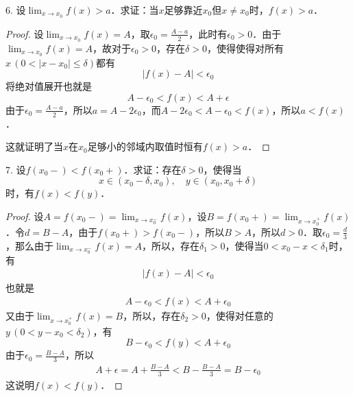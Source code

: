 6. 设$\displaystyle\lim_{x \to x_0} f(x) > a$．求证：当$x$足够靠近$x_0$但$x \neq x_0$时，$f(x) > a$．

\begin{proof}
设$\displaystyle\lim_{x \to x_0} f(x) = A$，取$\epsilon_0 = \displaystyle\frac{A-a}{2}$，此时有$\epsilon_0 > 0$．由于$\displaystyle\lim_{x \to x_0} f(x) = A$，故对于$\epsilon_0 > 0$，存在$\delta > 0$，使得使得对所有$x \, (0 < |x-x_0| \leq \delta)$都有
\begin{equation}
    |f(x)-A|<\epsilon_0
\end{equation}
将绝对值展开也就是
\begin{equation}
    A-\epsilon_0 < f(x) < A+\epsilon
\end{equation}
由于$\epsilon_0=\displaystyle\frac{A-a}{2}$，所以$a = A - 2\epsilon_0$，而$A-2\epsilon_0 < A - \epsilon_0 < f(x)$，所以$a < f(x)$．

这就证明了当$x$在$x_0$足够小的邻域内取值时恒有$f(x) > a$．
\end{proof}

7. 设$f(x_0 -) < f(x_0 +)$．求证：存在$\delta > 0$，使得当
\begin{equation}
    x \in (x_0 - \delta, x_0), \quad y \in (x_0, x_0 + \delta)
\end{equation}
时，有$f(x) < f(y)$．

\begin{proof}
设$A = f(x_0 -) = \displaystyle\lim_{x \to x_0^-} f(x)$，设$B = f(x_0 +) = \displaystyle\lim_{x \to x_0^+} f(x)$．令$d = B - A$，由于$f(x_0 +) > f(x_0 -)$，所以$B > A$，所以$d > 0$．取$\epsilon_0 = \displaystyle\frac{d}{3}$，那么由于$\displaystyle\lim_{x \to x_0^-} f(x) = A$，所以，存在$\delta_1 > 0$，使得当$0 < x_0 - x < \delta_1$时，有
\begin{align}
    |f(x) - A|<\epsilon_0
\end{align}
也就是
\begin{align}
    A - \epsilon_0 < f(x) < A + \epsilon_0
\end{align}
又由于$\displaystyle\lim_{x \to x_0^+} f(x) = B$，所以，存在$\delta_2 > 0$，使得对任意的$y \, (0 < y - x_0 < \delta_2)$，有
\begin{equation}
    B - \epsilon_0 < f(y) < A + \epsilon_0
\end{equation}
由于$\epsilon_0 = \displaystyle\frac{B-A}{3}$，所以
\begin{align}
    A + \epsilon = A + \frac{B-A}{3} < B - \frac{B-A}{3} = B-\epsilon_0
\end{align}
这说明$f(x) < f(y)$．
\end{proof}

